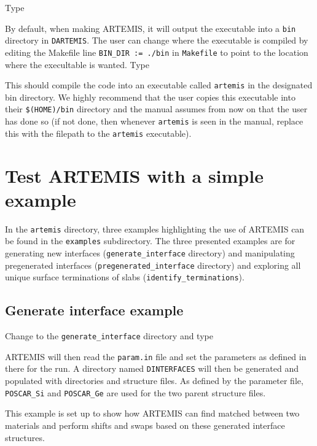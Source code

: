 \documentclass[12pt,a4paper,onecolumn,titlepage]{report}
\newcommand{\codeinline}[2][]{{\tt#2}}
\newcommand{\codeline}[2][]{\hspace{2em}{\tt#2}}
\newcommand{\artemis}{{ARTEMIS}}
\begin{document}
Type 
\codeline{cd DARTEMIS}

\noindent
By default, when making \artemis{}, it will output the executable into a \codeinline{bin} directory in \codeinline{DARTEMIS}. The user can change where the executable is compiled by editing the Makefile line \codeinline{BIN\_DIR := ./bin} in \codeinline{Makefile} to point to the location where the execultable is wanted. Type

\codeline{make}

\noindent
This should compile the code into an executable called \codeinline{artemis} in the designated bin directory. We highly recommend that the user copies this executable into their \codeinline{\$(HOME)/bin} directory and the manual assumes from now on that the user has done so (if not done, then whenever \codeinline{artemis} is seen in the manual, replace this with the filepath to the \codeinline{artemis} executable).


\section{Test ARTEMIS with a simple example}
\label{sec:test_case}

In the \codeinline{artemis} directory, three examples highlighting the use of \artemis{} can be found in the \codeinline{examples} subdirectory. The three presented examples are for generating new interfaces (\codeinline{generate\_interface} directory) and manipulating pregenerated interfaces (\codeinline{pregenerated\_interface} directory) and exploring all unique surface terminations of slabs (\codeinline{identify\_terminations}).

\subsection{Generate interface example}
\label{sec:example_gen}

Change to the \codeinline{generate\_interface} directory and type

\codeline{artemis -f param.in}

\noindent
\artemis{} will then read the \codeinline{param.in} file and set the parameters as defined in there for the run. A directory named \codeinline{DINTERFACES} will then be generated and populated with directories and structure files. As defined by the parameter file, \codeinline{POSCAR\_Si} and \codeinline{POSCAR\_Ge} are used for the two parent structure files.

This example is set up to show how \artemis{} can find matched between two materials and perform shifts and swaps based on these generated interface structures.
\end{document}

